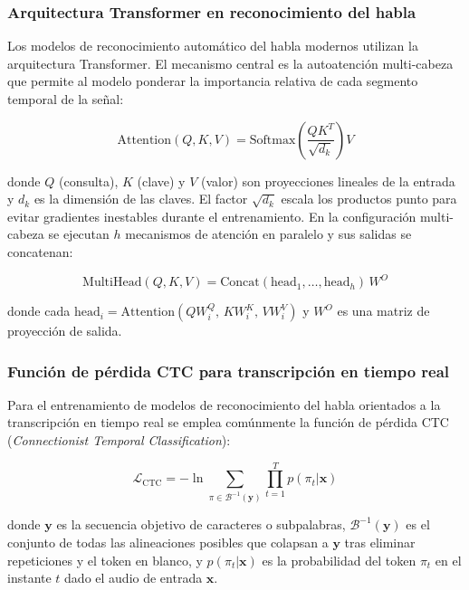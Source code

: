 \documentclass[12pt,a4paper,oneside]{article}
\begin{document}
\subsubsection{Arquitectura Transformer en reconocimiento del habla}

Los modelos de reconocimiento autom\'atico del habla modernos utilizan la arquitectura Transformer. El mecanismo central es la autoatenci\'on multi-cabeza que permite al modelo ponderar la importancia relativa de cada segmento temporal de la se\~nal:

\begin{equation}
\text{Attention}(Q, K, V) = \text{Softmax}\!\left(\frac{QK^T}{\sqrt{d_k}}\right) V
\end{equation}

donde $Q$ (consulta), $K$ (clave) y $V$ (valor) son proyecciones lineales de la entrada y $d_k$ es la dimensi\'on de las claves. El factor $\sqrt{d_k}$ escala los productos punto para evitar gradientes inestables durante el entrenamiento. En la configuraci\'on multi-cabeza se ejecutan $h$ mecanismos de atenci\'on en paralelo y sus salidas se concatenan:

\begin{equation}
\text{MultiHead}(Q, K, V) = \text{Concat}(\text{head}_1, \ldots, \text{head}_h)\, W^O
\end{equation}

donde cada $\text{head}_i = \text{Attention}(QW_i^Q,\, KW_i^K,\, VW_i^V)$ y $W^O$ es una matriz de proyecci\'on de salida.

\subsubsection{Funci\'on de p\'erdida CTC para transcripci\'on en tiempo real}

Para el entrenamiento de modelos de reconocimiento del habla orientados a la transcripci\'on en tiempo real se emplea com\'unmente la funci\'on de p\'erdida CTC (\textit{Connectionist Temporal Classification}):

\begin{equation}
\mathcal{L}_{\text{CTC}} = -\ln \sum_{\pi \in \mathcal{B}^{-1}(\mathbf{y})} \prod_{t=1}^{T} p(\pi_t | \mathbf{x})
\end{equation}

donde $\mathbf{y}$ es la secuencia objetivo de caracteres o subpalabras, $\mathcal{B}^{-1}(\mathbf{y})$ es el conjunto de todas las alineaciones posibles que colapsan a $\mathbf{y}$ tras eliminar repeticiones y el token en blanco, y $p(\pi_t | \mathbf{x})$ es la probabilidad del token $\pi_t$ en el instante $t$ dado el audio de entrada $\mathbf{x}$.
\end{document}

